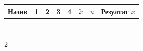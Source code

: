 \documentclass[10pt]{article}
\begin{document}
\begin{table}[htbp]
  \centering
  \renewcommand{\arraystretch}{1.8}
  \begin{tabularx}{\textwidth}{|p{2.8cm}|>{\centering\arraybackslash}X|>{\centering\arraybackslash}X|>{\centering\arraybackslash}X|>{\centering\arraybackslash}X|>{\centering\arraybackslash}X|>{\centering\arraybackslash}X|c|}
    \hline
    \hline
    \textbf{Назив} & \textbf{1} & \textbf{2} & \textbf{3} & \textbf{4} & $\tilde{x}$ & $u$ & \textbf{Резултат $x$} \\ \hline
    & & & & & & & \hspace{2.5cm} \\ \hline
    & & & & & & & \\ \hline
    & & & & & & & \\ \hline
    & & & & & & & \\ \hline
    & & & & & & & \\ \hline
  \end{tabularx}
\end{table}

\begin{multicols}{2}

\end{multicols}
\end{document}
